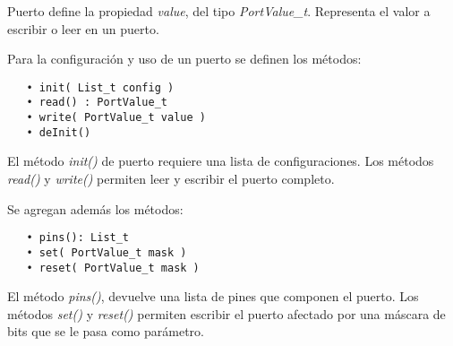 
Puerto define la propiedad \emph{value}, del tipo \emph{PortValue\_t}. Representa el valor a escribir o leer en un puerto.

Para la configuración y uso de un puerto se definen los métodos:

\begin{verbatim}
   • init( List_t config )
   • read() : PortValue_t
   • write( PortValue_t value )
   • deInit()
\end{verbatim}

El método \emph{init()} de puerto requiere una lista de configuraciones. Los métodos \emph{read()} y \emph{write()} permiten leer y escribir el puerto completo.

Se agregan además los métodos:

\begin{verbatim}
   • pins(): List_t
   • set( PortValue_t mask )
   • reset( PortValue_t mask )
\end{verbatim}

El método \emph{pins()}, devuelve una lista de pines que componen el puerto. Los métodos \emph{set()} y \emph{reset()} permiten escribir el puerto afectado por una máscara de bits que se le pasa como parámetro.






